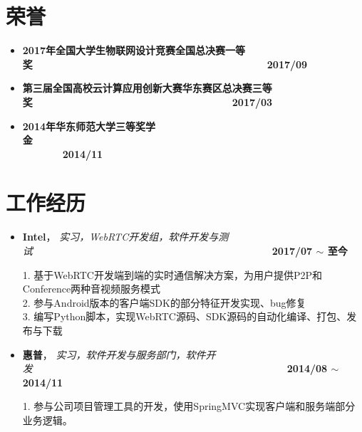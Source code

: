 \documentclass[letterpaper, UTF8, 11pt]{article}
\begin{document}
	\section*{\textbf{荣誉}}\vspace{-0.15in}
	\begin{itemize}
		\item \textbf{2017年全国大学生物联网设计竞赛全国总决赛一等奖}~~~~~~~~~~~~~~~~~~~~~~~~~~~~~~~~~~~~~~~~~~~~~~~\textbf{2017/09}
		\item \textbf{第三届全国高校云计算应用创新大赛华东赛区总决赛三等奖}~~~~~~~~~~~~~~~~~~~~~~~~~~~~~~~~~~~~~~~~\textbf{2017/03}
		\item \textbf{2014年华东师范大学三等奖学金}~~~~~~~~~~~~~~~~~~~~~~~~~~~~~~~~~~~~~~~~~~~~~~~~~~~~~~~~~~~~~~~~~~~~~~~~~~\textbf{2014/11}
	\end{itemize}
	\vspace{-0.32in}
	
	\section*{\textbf{工作经历}}\vspace{-0.15in}
	\begin{itemize}
		\item \textbf{Intel}， \emph{实习，WebRTC开发组，软件开发与测试}~~~~~~~~~~~~~~~~~~~~~~~~~~~~~~~~~~~~~~~~~~~~~~~~\textbf{2017/07 $\sim$ 至今}
		
		1. 基于WebRTC开发端到端的实时通信解决方案，为用户提供P2P和Conference两种音视频服务模式\\
		2. 参与Android版本的客户端SDK的部分特征开发实现、bug修复\\
		3. 编写Python脚本，实现WebRTC源码、SDK源码的自动化编译、打包、发布与下载
		\item \textbf{惠普}， \emph{实习，软件开发与服务部门，软件开发}~~~~~~~~~~~~~~~~~~~~~~~~~~~~~~~~~~~~~~~~~~~~~~~~~~~\textbf{2014/08 $\sim$ 2014/11}
		
		1. 参与公司项目管理工具的开发，使用SpringMVC实现客户端和服务端部分业务逻辑。
	\end{itemize}
	\vspace{-0.32in}
	
\end{document}
